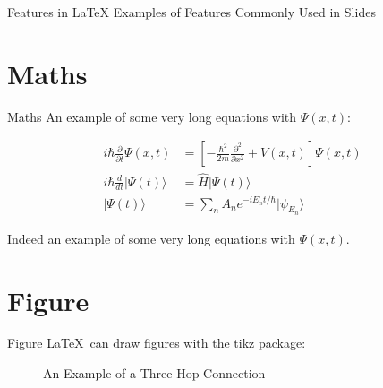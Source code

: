 \documentclass{anu-slide} %
\begin{document}
\begin{titleframe}{Features in \LaTeX}
    Examples of Features Commonly Used in Slides
\end{titleframe}

\section{Maths}

\begin{frame}{Maths}
    An example of some very long equations with $\Psi (x,t)$:
    
    \begin{align}
    i\hbar {\frac {\partial }{\partial t}}\Psi (x,t)&=\left[-{\frac {\hbar ^{2}}{2m}}{\frac {\partial ^{2}}{\partial x^{2}}}+V(x,t)\right]\Psi (x,t) \\
    i\hbar {\frac {d}{dt}}\vert \Psi (t)\rangle &={\hat {H}}\vert \Psi (t)\rangle \\ 
    |\Psi (t)\rangle &=\sum _{n}A_{n}e^{{-iE_{n}t}/\hbar }|\psi _{E_{n}}\rangle
    \end{align}
    
    Indeed an example of some very long equations with $\Psi (x,t)$.
\end{frame}

\section{Figure}
\begin{frame}{Figure}
    \LaTeX\ can draw figures with the tikz package:
    \begin{figure}[h]
    \centering
    \caption{An Example of a Three-Hop Connection}
    \label{fig:three-hop}
    \end{figure}
\end{frame}

\end{document}
